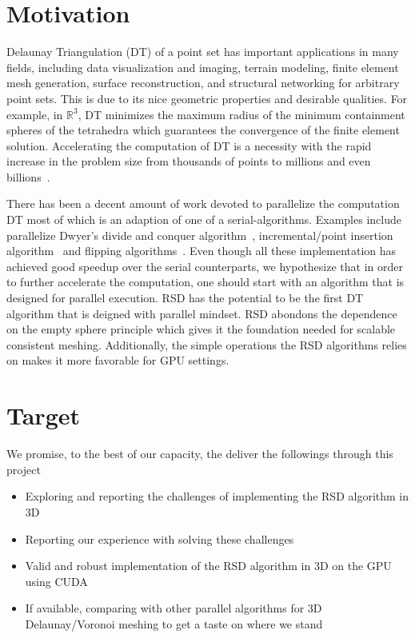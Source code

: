 \documentclass[12pt] {article}
\begin{document}
\section*{Motivation}
Delaunay Triangulation (DT) of a point set has important applications in many fields, including data visualization and imaging, terrain modeling, finite element mesh generation, surface reconstruction, and structural networking for arbitrary point sets. This is due to its nice geometric properties and desirable qualities. For example, in $\mathbb{R}^{3}$, DT minimizes the maximum radius of the minimum containment spheres of the tetrahedra which guarantees the convergence of the finite element solution. Accelerating the computation of DT is a necessity with the rapid increase in the problem size from thousands of points to millions and even billions~\citep{lo20153d}. 

There has been a decent amount of work devoted to parallelize the computation DT most of which is an adaption of one of a serial-algorithms. Examples include parallelize Dwyer's divide and conquer algorithm~\citep{fuetterling2014high, cignoni1998dewall, 574023, lo20153d}, incremental/point insertion algorithm~\citep{cao2014gpu, batista2010parallel} and flipping algorithms~\citep{liparulo2015fuzzy}. Even though all these implementation has achieved good speedup over the serial counterparts, we hypothesize that in order to further accelerate the computation, one should start with an algorithm that is designed for parallel execution. RSD has the potential to be the first DT algorithm that is deigned with parallel mindset. RSD abondons the dependence on the empty sphere principle which gives it the foundation needed for scalable consistent meshing. Additionally, the simple operations the RSD algorithms relies on makes it more favorable for GPU settings. 




\section*{Target}
We promise, to the best of our capacity, the deliver the followings through this project
\begin{itemize}
\item Exploring and reporting the challenges of implementing the RSD algorithm in 3D
\item Reporting our experience with solving these challenges 
\item Valid and robust implementation of the RSD algorithm in 3D on the GPU using CUDA
\item If available, comparing with other parallel algorithms for 3D Delaunay/Voronoi meshing to get a taste on where we stand 
\end{itemize}



\end{document}
